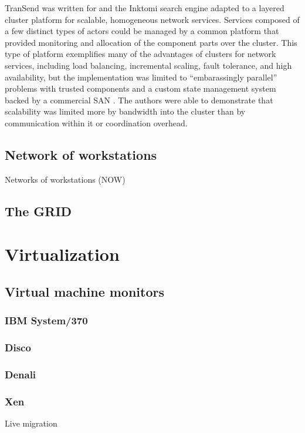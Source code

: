 TranSend was written for and the Inktomi search engine adapted to a layered cluster platform for scalable, homogeneous network services. Services composed of a few distinct types of actors could be managed by a common platform that provided monitoring and allocation of the component parts over the cluster. This type of platform exemplifies many of the advantages of clusters for network services, including load balancing, incremental scaling, fault tolerance, and high availability, but the implementation was limited to ``embarassingly parallel'' problems with trusted components and a custom state management system backed by a commercial SAN \cite{fox}. The authors were able to demonstrate that scalability was limited more by bandwidth into the cluster than by communication within it or coordination overhead.

\subsection{Network of workstations}
Networks of workstations (NOW)\cite{anderson95a}

\subsection{The GRID}
\cite{zhao}

\section{Virtualization}

\subsection{Virtual machine monitors}
\subsubsection{IBM System/370}
\subsubsection{Disco}
\subsubsection{Denali}
\subsubsection{Xen}
\cite{barham}
Live migration \cite{clark} \cite{sapuntzakis02}
